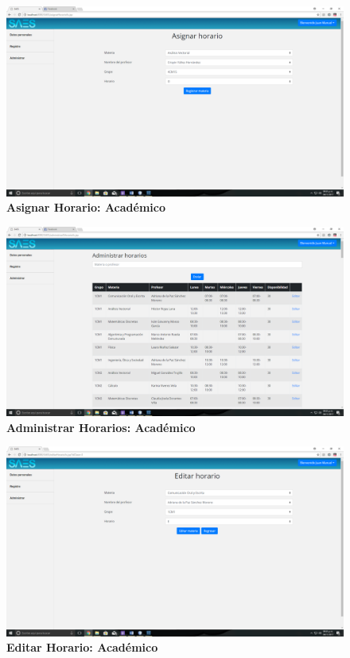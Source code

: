 \begin{figure}[H]
  \centering
    \includegraphics[scale=0.2]{project/images/11.png}
  \caption{\textbf{Asignar Horario: Académico}}
\end{figure}
\begin{figure}[H]
  \centering
    \includegraphics[scale=0.2]{project/images/12.png}
  \caption{\textbf{Administrar Horarios: Académico}}
\end{figure}
\begin{figure}[H]
  \centering
    \includegraphics[scale=0.2]{project/images/13.png}
  \caption{\textbf{Editar Horario: Académico}}
\end{figure}
